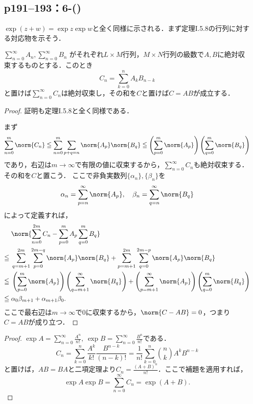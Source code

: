 \subsection*{p191--193：6-()}

$\exp(z + w) = \exp z \exp w$と全く同様に示される．まず定理I.5.8の行列に対する対応物を示そう．


$\sum_{n=0}^\infty A_n, \sum_{n=0}^\infty B_n$ がそれぞれ$L \times M$行列，$M \times N$行列の級数で$A, B$に絶対収束するものとする．このとき
\[
    C_n = \sum_{k=0}^n A_kB_{n-k}
\]
と置けば$\sum_{n=0}^\infty C_n$は絶対収束し，その和を$C$と置けば$C = AB$が成立する．

\begin{proof}
    証明も定理I.5.8と全く同様である．

    まず
    \[
        \sum_{n = 0}^m\norm{C_n} \leq \sum_{n = 0}^m\sum_{p + q = n}\norm{A_p}\norm{B_q} \leq \left(\sum_{p=0}^m \norm{A_p}\right) \left(\sum_{q=0}^m \norm{B_q}\right)
    \]
    であり，右辺は$m \to \infty$で有限の値に収束するから，$\sum_{n=0}^\infty C_n$も絶対収束する．その和を$C$と置こう．
    ここで非負実数列$\{\alpha_n\}, \{\beta_n\}$を
    \[
        \alpha_n = \sum_{p = n}^\infty \norm{A_p},\quad \beta_n = \sum_{q = n}^\infty \norm{B_q}
    \]
    によって定義すれば，
    \begin{align*}
               & \norm{\sum_{n=0}^{2m} C_n - \sum_{p = 0}^m A_p \sum_{q = 0}^m B_q}                                                                                                  \\
        \leq{} & \sum_{q = m + 1}^{2m} \sum_{p = 0}^{2m - q} \norm{A_p}\norm{B_q} + \sum_{p = m+1}^{2m}\sum_{q = 0}^{2m - p} \norm{A_p}\norm{B_q}                                    \\
        \leq{} & \left(\sum_{p=0}^m \norm{A_p}\right) \left(\sum_{q=m+1}^\infty \norm{B_q}\right) + \left(\sum_{p=m+1}^\infty \norm{A_p}\right) \left(\sum_{q=0}^m \norm{B_q}\right) \\
        \leq{} & \alpha_0\beta_{m+1} + \alpha_{m+1}\beta_0.
    \end{align*}
    ここで最右辺は$m \to \infty$で$0$に収束するから，$\norm{C - AB} = 0$，つまり$C = AB$が成り立つ．
\end{proof}

\begin{tleftbar}
    \begin{proof}
        $\exp A = \sum_{n=0}^\infty \frac{A^n}{n!},\ \exp B = \sum_{n=0}^\infty \frac{B^n}{n!}$である．
        \[
            C_n = \sum_{k = 0}^n \frac{A^k}{k!} \frac{B^{n-k}}{(n-k)!}
            = \frac{1}{n!} \sum_{k=0}^n \binom{n}{k} A^k B^{n-k}
        \]
        と置けば，$AB = BA$と二項定理より$C_n = \frac{(A + B)^n}{n!}$．ここで補題を適用すれば，
        \[
            \exp A \exp B = \sum_{n=0}^\infty C_n = \exp(A + B).
        \]
    \end{proof}
\end{tleftbar}


